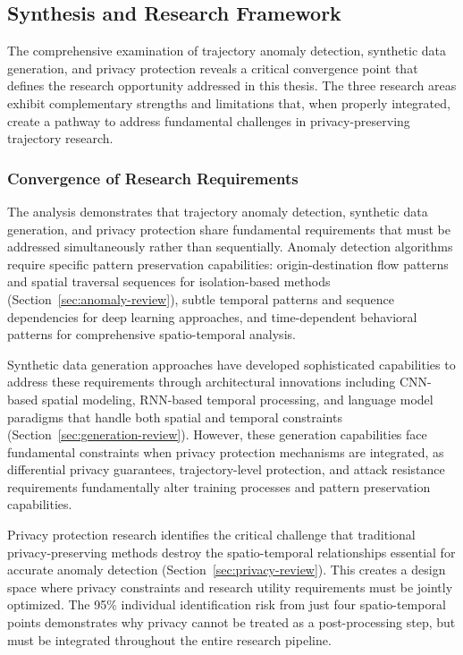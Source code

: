 \documentclass[runningheads]{llncs}
\begin{document}
\subsection{Synthesis and Research Framework}
\label{sec:synthesis}

The comprehensive examination of trajectory anomaly detection, synthetic data generation, and privacy protection reveals a critical convergence point that defines the research opportunity addressed in this thesis. The three research areas exhibit complementary strengths and limitations that, when properly integrated, create a pathway to address fundamental challenges in privacy-preserving trajectory research.

\subsubsection{Convergence of Research Requirements}

The analysis demonstrates that trajectory anomaly detection, synthetic data generation, and privacy protection share fundamental requirements that must be addressed simultaneously rather than sequentially. Anomaly detection algorithms require specific pattern preservation capabilities: origin-destination flow patterns and spatial traversal sequences for isolation-based methods (Section~\ref{sec:anomaly-review}), subtle temporal patterns and sequence dependencies for deep learning approaches, and time-dependent behavioral patterns for comprehensive spatio-temporal analysis.

Synthetic data generation approaches have developed sophisticated capabilities to address these requirements through architectural innovations including CNN-based spatial modeling, RNN-based temporal processing, and language model paradigms that handle both spatial and temporal constraints (Section~\ref{sec:generation-review}). However, these generation capabilities face fundamental constraints when privacy protection mechanisms are integrated, as differential privacy guarantees, trajectory-level protection, and attack resistance requirements fundamentally alter training processes and pattern preservation capabilities.

Privacy protection research identifies the critical challenge that traditional privacy-preserving methods destroy the spatio-temporal relationships essential for accurate anomaly detection (Section~\ref{sec:privacy-review}). This creates a design space where privacy constraints and research utility requirements must be jointly optimized. The 95\% individual identification risk from just four spatio-temporal points demonstrates why privacy cannot be treated as a post-processing step, but must be integrated throughout the entire research pipeline.
\end{document}
